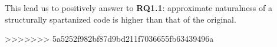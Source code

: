This lead us to positively answer to \textbf{RQ1.1}: 
approximate naturalness of a structurally spartanized code
is higher than that of the original.

>>>>>>> 5a5252f982bf87d9bd211f7036655fb63439496a

